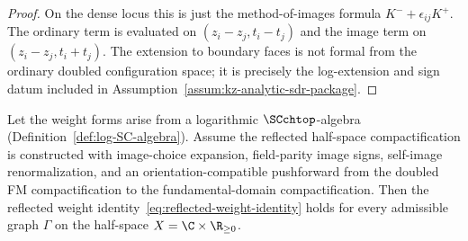 \begin{proof}
On the dense locus this is just the method-of-images formula
$K^{-}+\epsilon_{ij}K^{+}$. The ordinary term is evaluated on
$(z_i-z_j,t_i-t_j)$ and the image term on $(z_i-z_j,t_i+t_j)$. The
extension to boundary faces is not formal from the ordinary doubled
configuration space; it is precisely the log-extension and sign datum
included in Assumption~\ref{assum:kz-analytic-sdr-package}.
\end{proof}

\begin{theorem}
\label{thm:doubling-rwi}
Let the weight forms arise from a logarithmic $\SCchtop$-algebra
(Definition~\ref{def:log-SC-algebra}). Assume the reflected
half-space compactification is constructed with image-choice expansion,
field-parity image signs, self-image renormalization, and an
orientation-compatible pushforward from the doubled FM compactification
to the fundamental-domain compactification. Then the reflected weight
identity~\eqref{eq:reflected-weight-identity} holds for every
admissible graph $\Gamma$ on the half-space $X=\C\times\R_{\ge 0}$.
\end{theorem}

